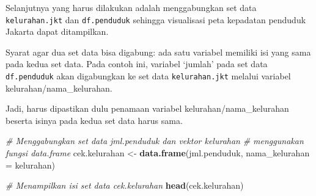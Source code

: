 \documentclass[openany]{book}
\newenvironment{Shaded}{\begin{snugshade}}{\end{snugshade}}
\newcommand{\KeywordTok}[1]{\textcolor[rgb]{0.13,0.29,0.53}{\textbf{#1}}}
\newcommand{\DataTypeTok}[1]{\textcolor[rgb]{0.13,0.29,0.53}{#1}}
\newcommand{\StringTok}[1]{\textcolor[rgb]{0.31,0.60,0.02}{#1}}
\newcommand{\CommentTok}[1]{\textcolor[rgb]{0.56,0.35,0.01}{\textit{#1}}}
\newcommand{\OperatorTok}[1]{\textcolor[rgb]{0.81,0.36,0.00}{\textbf{#1}}}
\newcommand{\NormalTok}[1]{#1}
\begin{document}
Selanjutnya yang harus dilakukan adalah menggabungkan set data
\texttt{kelurahan.jkt} dan \texttt{df.penduduk} sehingga visualisasi
peta kepadatan penduduk Jakarta dapat ditampilkan.

Syarat agar dua set data bisa digabung: ada satu variabel memiliki isi
yang sama pada kedua set data. Pada contoh ini, variabel `jumlah' pada
set data \texttt{df.penduduk} akan digabungkan ke set data
\texttt{kelurahan.jkt} melalui variabel kelurahan/nama\_kelurahan.

Jadi, harus dipastikan dulu penamaan variabel kelurahan/nama\_kelurahan
beserta isinya pada kedua set data harus sama.

\begin{Shaded}
\end{Shaded}

\begin{Shaded}
\end{Shaded}

\begin{Shaded}
\begin{Highlighting}[]
\CommentTok{# Menggabungkan set data jml.penduduk dan vektor kelurahan}
\CommentTok{# menggunakan fungsi data.frame}
\NormalTok{cek.kelurahan <-}\StringTok{ }\KeywordTok{data.frame}\NormalTok{(jml.penduduk, }\DataTypeTok{nama_kelurahan =}\NormalTok{ kelurahan)}
\end{Highlighting}
\end{Shaded}

\begin{Shaded}
\begin{Highlighting}[]
\CommentTok{# Menampilkan isi set data cek.kelurahan}
\KeywordTok{head}\NormalTok{(cek.kelurahan)}
\end{Highlighting}
\end{Shaded}
\end{document}
